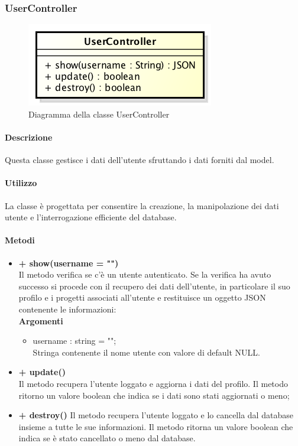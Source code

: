 \subsubsection{UserController}
\begin{figure}[h]
\centering
\includegraphics[width=0.5\linewidth]{img/back_end_http_controllers_userController}
\caption[Diagramma della classe UserController]{Diagramma della classe UserController}
\label{fig:back_end_http_controllers_userController}
\end{figure}

	\paragraph{Descrizione}
		Questa classe gestisce i dati dell'utente sfruttando i dati forniti dal model.
	\paragraph{Utilizzo}
		La classe è progettata per consentire la creazione, la manipolazione  dei dati utente e l'interrogazione efficiente del database.

	\paragraph{Metodi}
		\begin{itemize}
			\item \textbf{+ show(username = "")}\\
			Il metodo verifica se c'è un utente autenticato. Se la verifica ha avuto successo si procede con il recupero dei dati dell'utente, in particolare il suo profilo e i progetti associati all'utente e restituisce un oggetto JSON contenente le informazioni:\\
			\textbf{Argomenti}
			\begin{itemize}
				\item username : string = "";\\
				Stringa contenente il nome utente con valore di default NULL.
			\end{itemize}
			
			\item \textbf{+ update()}\\
			Il metodo recupera l'utente loggato e aggiorna i dati del profilo. Il metodo ritorno un valore boolean che indica se i dati sono stati aggiornati o meno;
			
			\item \textbf{+ destroy()}
			Il metodo recupera l'utente loggato e lo cancella dal database insieme a tutte le  sue informazioni. Il metodo ritorna un valore boolean che indica se è stato cancellato o meno dal database.
		\end{itemize}
		
